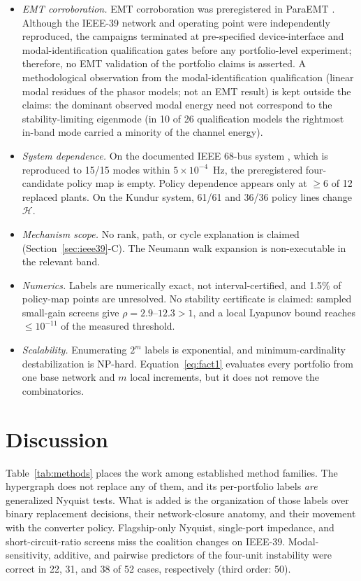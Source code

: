 \documentclass[journal]{IEEEtran}
\theoremstyle{definition}
\theoremstyle{remark}
\newcommand{\Hy}{\mathcal{H}}
\begin{document}
\begin{itemize}
branch ranking changes (7/12 signs). ANDES also confirms the governor damping
direction.
\item \emph{EMT corroboration.} EMT corroboration was preregistered in ParaEMT
\cite{xiong2024paraemt}. Although the IEEE-39 network and operating point were
independently reproduced, the campaigns terminated at pre-specified
device-interface and modal-identification qualification gates before any
portfolio-level experiment; therefore, no EMT validation of the portfolio
claims is asserted. A methodological observation from the modal-identification
qualification (linear modal residues of the phasor models; not an EMT result)
is kept outside the claims: the dominant observed modal energy need not
correspond to the stability-limiting eigenmode (in 10 of 26 qualification
models the rightmost in-band mode carried a minority of the channel energy).
\item \emph{System dependence.} On the documented IEEE 68-bus system
\cite{canizares2015benchmark}, which is reproduced to 15/15 modes within
$5\times10^{-4}$~Hz, the preregistered four-candidate policy map is empty.
Policy dependence appears only at $\ge6$ of 12 replaced plants. On the Kundur
system, 61/61 and 36/36 policy lines change $\Hy$.
\item \emph{Mechanism scope.} No rank, path, or cycle explanation is claimed
(Section~\ref{sec:ieee39}-C). The Neumann walk expansion is non-executable in
the relevant band.
\item \emph{Numerics.} Labels are numerically exact, not interval-certified,
and 1.5\% of policy-map points are unresolved. No stability certificate is
claimed: sampled small-gain screens give $\rho=2.9$--$12.3>1$, and a local
Lyapunov bound reaches $\le10^{-11}$ of the measured threshold.
\item \emph{Scalability.} Enumerating $2^m$ labels is exponential, and
minimum-cardinality destabilization is NP-hard. Equation~\eqref{eq:fact1}
evaluates every portfolio from one base network and $m$ local increments, but
it does not remove the combinatorics.
\end{itemize}

\section{Discussion}\label{sec:discussion}
Table~\ref{tab:methods} places the work among established method families.
The hypergraph does not replace any of them, and its per-portfolio labels
\emph{are} generalized Nyquist tests. What is added is the organization of those
labels over binary replacement decisions, their network-closure anatomy, and
their movement with the converter policy. Flagship-only Nyquist, single-port
impedance, and short-circuit-ratio screens miss the coalition changes on
IEEE-39. Modal-sensitivity, additive, and pairwise predictors of the four-unit
instability were correct in 22, 31, and 38 of 52 cases, respectively (third
order: 50).
\end{document}
